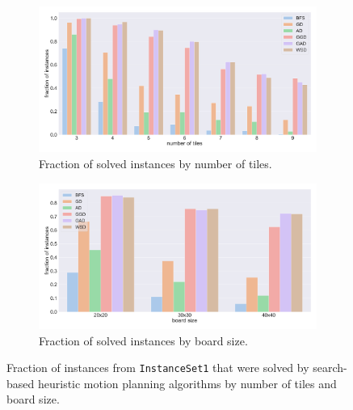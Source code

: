 \begin{figure}[H]
\begin{subfigure}[b]{\textwidth}
\centering
\includegraphics[width=\textwidth]{figures/plots/heuristic_solvers_i1/hs_i1_fraction_solved_over_tiles.pdf}
\caption{Fraction of solved instances by number of tiles.}
\label{fig:hs_i1_fraction_solved_over_tiles}
\end{subfigure}
\begin{subfigure}[b]{\textwidth}
\centering
\includegraphics[width=\textwidth]{figures/plots/heuristic_solvers_i1/hs_i1_fraction_solved_over_board_size.pdf}
\caption{Fraction of solved instances by board size.}
\label{fig:hs_i1_fraction_solved_over_board_size}
\end{subfigure}
\caption [Fraction of \texttt{InstanceSet1} solved by the search-based planners] {Fraction of instances from \texttt{InstanceSet1} that were solved by search-based heuristic motion planning algorithms by number of tiles and board size.}
\label{fig:hs_i1_performance2}
\end{figure}
